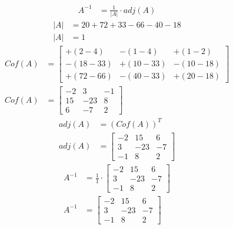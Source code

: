 \documentclass[10pt, a4paper]{article}
\begin{document}
\begin{align*}
  A^{-1} &= \frac{1}{\left|A\right|} \cdot adj\left(A\right)
\end{align*}
\begin{align*}
  \left|A\right| &= 20 + 72 + 33 - 66 - 40 - 18\\
  \left|A\right| &= 1
\end{align*}
\begin{align*}
  Cof\left(A\right) &= \begin{bmatrix}
    +\left(2-4\right) & -\left(1-4\right) & +\left(1-2\right)\\
    -\left(18-33\right) & +\left(10-33\right) & -\left(10-18\right)\\
    +\left(72-66\right) & -\left(40-33\right) & +\left(20-18\right)
  \end{bmatrix}\\
  Cof\left(A\right) &= \begin{bmatrix}
    -2 & 3 & -1\\
    15 & -23 & 8\\
    6 & -7 & 2
  \end{bmatrix}
\end{align*}
\begin{align*}
  adj\left(A\right) &= \left(Cof\left(A\right)\right)^T\\
  adj\left(A\right) &= \begin{bmatrix}
    -2 & 15 & 6\\
    3 & -23 & -7\\
    -1 & 8 & 2
  \end{bmatrix}
\end{align*}
\begin{align*}
  A^{-1} &= \frac{1}{1} \cdot \begin{bmatrix}
    -2 & 15 & 6\\
    3 & -23 & -7\\
    -1 & 8 & 2
  \end{bmatrix}\\
  A^{-1} &= \begin{bmatrix}
    -2 & 15 & 6\\
    3 & -23 & -7\\
    -1 & 8 & 2
  \end{bmatrix}
\end{align*}
\end{document}

